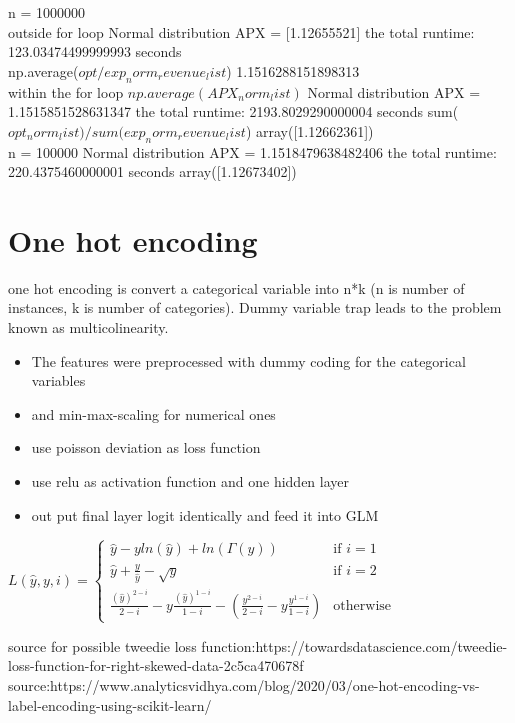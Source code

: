 n  = 1000000\\
outside for loop
Normal distribution APX = [1.12655521]
the total runtime: 123.03474499999993 seconds\\

np.average($opt/exp_norm_revenue_list$)
1.1516288151898313
\\
within the for loop
$np.average(APX_norm_list)$
Normal distribution APX = 1.1515851528631347
the total runtime: 2193.8029290000004 seconds
sum($opt_norm_list)/sum(exp_norm_revenue_list$)
array([1.12662361])\\
n = 100000
Normal distribution APX = 1.1518479638482406
the total runtime: 220.4375460000001 seconds
array([1.12673402])\\

\chapter{One hot encoding}
one hot encoding is convert a categorical variable into n*k (n is number of instances, k is number of categories).
Dummy variable trap leads to the problem known as multicolinearity. 

\begin{itemize}
	\item The  features  were  preprocessed  with  dummy  coding  for  the  categorical  variables
	\item and min-max-scaling for numerical ones
	\item use poisson deviation as loss function
	\item use relu as activation function and one hidden layer
	\item out put final layer logit identically and feed it into GLM
	
\end{itemize}
 
$L(\hat{y}, y, i) =\begin{cases}
	
	\hat{y} - y ln(\hat{y}) + ln(\Gamma(y)) & \text{if } i = 1 \\
	
	\hat{y} + \frac{y}{\hat{y}} - \sqrt{y} & \text{if } i = 2 \\
	
	\frac{(\hat{y})^{2 - i}}{2 - i} - y \frac{(\hat{y})^{1 - i}}{1 - i} - (\frac{y^{2 - i}}{2 - i} - y\frac{y^{1 - i}}{1 - i}) & \text{otherwise}\end{cases}$ 
 
source for possible tweedie loss function:https://towardsdatascience.com/tweedie-loss-function-for-right-skewed-data-2c5ca470678f \\
source:https://www.analyticsvidhya.com/blog/2020/03/one-hot-encoding-vs-label-encoding-using-scikit-learn/

